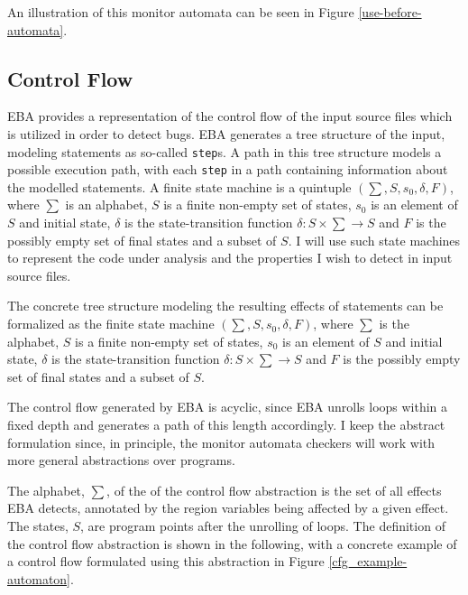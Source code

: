 An illustration of this monitor automata can be seen in Figure \ref{use-before-automata}. 

\subsection{Control Flow}

EBA provides a representation of the control flow of the input source files which is utilized in order to detect bugs. EBA generates a tree structure of the input, modeling statements as so-called \texttt{step}s. A path in this tree structure models a possible execution path, with each \texttt{step} in a path containing information about the modelled statements. A finite state machine is a quintuple $(\sum, S, s_0, \delta, F)$, where $\sum$ is an alphabet, $S$ is a finite non-empty set of states, $s_0$ is an element of $S$ and initial state, $\delta$ is the state-transition function $\delta: S \times \sum \rightarrow S$ and $F$ is the possibly empty set of final states and a subset of $S$. I will use such state machines to represent the code under analysis and the properties I wish to detect in input source files. 

The concrete tree structure modeling the resulting effects of statements can be formalized as the finite state machine $(\sum, S, s_0, \delta, F)$, where $\sum$ is the alphabet, $S$ is a finite non-empty set of states, $s_0$ is an element of $S$ and initial state, $\delta$ is the state-transition function $\delta: S \times \sum \rightarrow S$ and $F$ is the possibly empty set of final states and a subset of $S$. 

The control flow generated by EBA is acyclic, since EBA unrolls loops within a fixed depth and generates a path of this length accordingly. I keep the abstract formulation since, in principle, the monitor automata checkers will work with more general abstractions over programs.

The alphabet, $\sum$, of the of the control flow abstraction is the set of all effects EBA detects, annotated by the region variables being affected by a given effect. The states, $S$, are program points after the unrolling of loops. The definition of the control flow abstraction is shown in the following, with a concrete example of a control flow formulated using this abstraction in Figure \ref{cfg_example-automaton}. 

